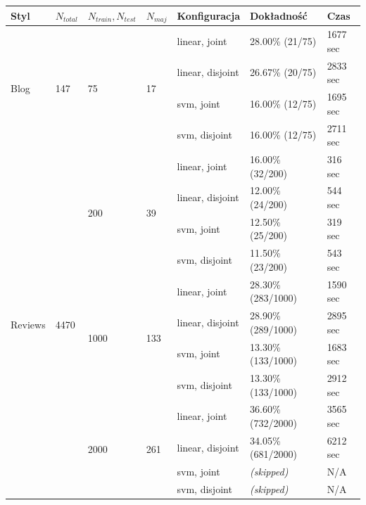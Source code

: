 \documentclass{article}
\begin{document}
\begin{adjustwidth}{-3.5cm}{-0cm}

\begin{tabular}{|p{2cm}|p{2cm}|p{2cm}|p{2cm}|p{3cm}|p{3cm}|p{3cm}|}

\hline

\textbf{Styl} & \textbf{$N_{total}$} & \textbf{$N_{train}, N_{test}$} & $N_{maj}$ & \textbf{Konfiguracja} & \textbf{Dokładność} & \textbf{Czas} \\  \hline

\multirow{4}{*}{Blog} & \multirow{4}{*}{147}	& \multirow{4}{*}{75} & \multirow{4}{*}{17} & 
linear, joint & 28.00\% (21/75) & 1677 sec \\  \cline{5-7}
& & & & 
linear, disjoint & 26.67\% (20/75) & 2833 sec \\  \cline{5-7}
& & & & 
svm, joint & 16.00\% (12/75) & 1695 sec \\  \cline{5-7}
& & & & 
svm, disjoint & 16.00\% (12/75) & 2711 sec \\  \hline

\multirow{12}{*}{Reviews} & \multirow{12}{*}{4470} & \multirow{4}{*}{200} & \multirow{4}{*}{39} & 
linear, joint & 16.00\% (32/200) & 316 sec \\  \cline{5-7}
& & & & 
linear, disjoint & 12.00\% (24/200) & 544 sec \\  \cline{5-7}
& & & & 
svm, joint & 12.50\% (25/200) & 319 sec \\  \cline{5-7}
& & & & 
svm, disjoint & 11.50\% (23/200) & 543 sec \\  \cline{3-7}

& & \multirow{4}{*}{1000} & \multirow{4}{*}{133} & 
linear, joint & 28.30\% (283/1000) & 1590 sec \\  \cline{5-7}
& & & & 
linear, disjoint & 28.90\% (289/1000) & 2895 sec \\  \cline{5-7}
& & & & 
svm, joint & 13.30\% (133/1000) & 1683 sec \\  \cline{5-7}
& & & & 
svm, disjoint & 13.30\% (133/1000) & 2912 sec \\  \cline{3-7}

& & \multirow{4}{*}{2000} & \multirow{4}{*}{261} & 
linear, joint & 36.60\% (732/2000) & 3565 sec \\  \cline{5-7}
& & & & 
linear, disjoint & 34.05\% (681/2000) & 6212 sec \\  \cline{5-7}
& & & & 
svm, joint & \textit{(skipped)} & N/A \\  \cline{5-7}
& & & & 
svm, disjoint & \textit{(skipped)} & N/A \\  \hline


\end{tabular}
\end{adjustwidth}
\end{document}
